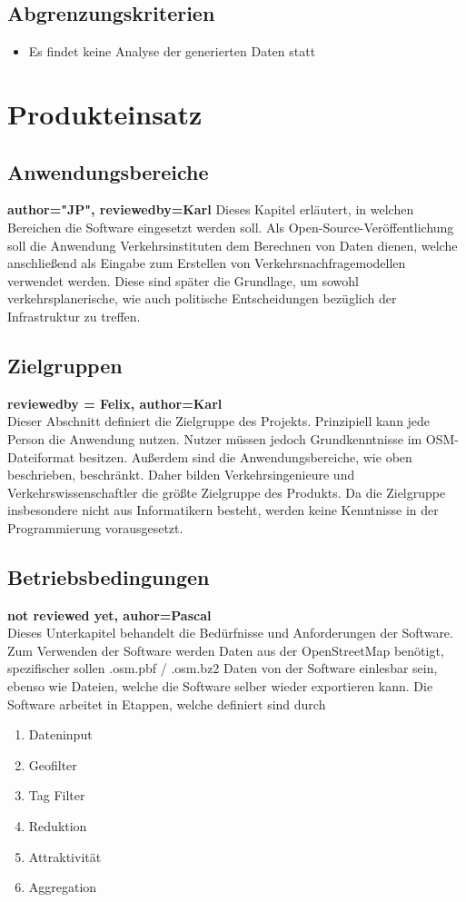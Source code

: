 \documentclass[parskip=full]{scrartcl} %
\begin{document}
\subsection{Abgrenzungskriterien}
\begin{itemize}
    \item Es findet keine Analyse der generierten Daten statt
\end{itemize}
\newpage



\section{Produkteinsatz}

\subsection{Anwendungsbereiche}
\textbf{author="JP", reviewedby=Karl} 
Dieses Kapitel erläutert, in welchen Bereichen die Software eingesetzt werden soll. Als Open-Source-Veröffentlichung soll die Anwendung Verkehrsinstituten dem Berechnen von Daten dienen, welche anschließend als Eingabe zum Erstellen von Verkehrsnachfragemodellen verwendet werden. Diese sind später die Grundlage, um sowohl verkehrsplanerische, wie auch politische Entscheidungen bezüglich der Infrastruktur zu treffen.

\subsection{Zielgruppen}
\textbf{reviewedby = Felix, author=Karl\\}
Dieser Abschnitt definiert die Zielgruppe des Projekts. Prinzipiell kann jede Person die Anwendung nutzen. Nutzer müssen jedoch Grundkenntnisse im OSM-Dateiformat besitzen. Außerdem sind die Anwendungsbereiche, wie oben beschrieben, beschränkt. Daher bilden Verkehrsingenieure und Verkehrswissenschaftler die größte Zielgruppe des Produkts. Da die Zielgruppe insbesondere nicht aus Informatikern besteht, werden keine Kenntnisse in der Programmierung vorausgesetzt.

\subsection{Betriebsbedingungen}
\textbf{not reviewed yet, auhor=Pascal\\}
Dieses Unterkapitel behandelt die Bedürfnisse und Anforderungen der Software.
Zum Verwenden der Software werden Daten aus der OpenStreetMap benötigt, spezifischer sollen .osm.pbf / .osm.bz2 Daten von der Software einlesbar sein, ebenso wie Dateien, welche die Software selber wieder exportieren kann.
Die Software arbeitet in Etappen, welche definiert sind durch
\begin{enumerate}
    \item Dateninput
    \item Geofilter
    \item Tag Filter
    \item Reduktion
    \item Attraktivität
    \item Aggregation
\end{enumerate}
\end{document}
